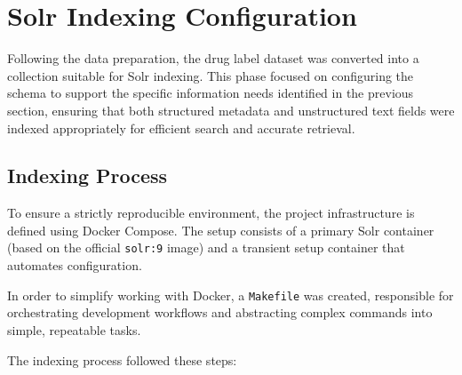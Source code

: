 \section{Solr Indexing Configuration}

Following the data preparation, the drug label dataset was converted into a collection suitable for Solr indexing. This phase focused on configuring the schema to support the specific information needs identified in the previous section, ensuring that both structured metadata and unstructured text fields were indexed appropriately for efficient search and accurate retrieval.

\subsection{Indexing Process}

To ensure a strictly reproducible environment, the project infrastructure is defined using Docker Compose. The setup consists of a primary Solr container (based on the official \texttt{solr:9} image) and a transient setup container that automates configuration.

In order to simplify working with Docker, a \texttt{Makefile} was created, responsible for orchestrating development workflows and abstracting complex commands into simple, repeatable tasks.

The indexing process followed these steps:

